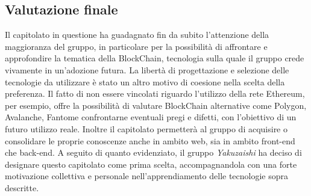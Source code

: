 \subsection{Valutazione finale}
Il capitolato in questione ha guadagnato fin da subito l'attenzione della maggioranza del gruppo, in particolare per la possibilità di affrontare e approfondire la tematica della BlockChain, tecnologia sulla quale il gruppo crede vivamente in un'adozione futura.
La libertà di progettazione e selezione delle tecnologie da utilizzare è stato un altro motivo di coesione nella scelta della preferenza. Il fatto di non essere vincolati riguardo l'utilizzo della rete Ethereum, per esempio, offre la possibilità di valutare BlockChain
alternative come Polygon\glo, Avalanche\glo, Fantom\glo e confrontarne eventuali pregi e difetti, con l'obiettivo di un futuro utilizzo reale.
\newline
Inoltre il capitolato permetterà al gruppo di acquisire o consolidare le proprie conoscenze anche in ambito web, sia in ambito front-end che back-end. A seguito di quanto evidenziato, il gruppo \textit{Yakuzaishi} ha deciso di designare questo capitolato come prima scelta,
accompagnandola con una forte motivazione collettiva e personale nell'apprendiamento delle tecnologie sopra descritte.
